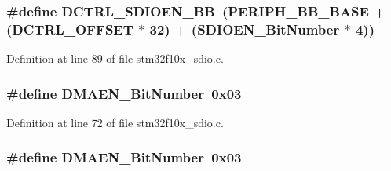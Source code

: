 \subsubsection[{\texorpdfstring{D\+C\+T\+R\+L\+\_\+\+S\+D\+I\+O\+E\+N\+\_\+\+BB}{DCTRL_SDIOEN_BB}}]{\setlength{\rightskip}{0pt plus 5cm}\#define D\+C\+T\+R\+L\+\_\+\+S\+D\+I\+O\+E\+N\+\_\+\+BB~({\bf P\+E\+R\+I\+P\+H\+\_\+\+B\+B\+\_\+\+B\+A\+SE} + ({\bf D\+C\+T\+R\+L\+\_\+\+O\+F\+F\+S\+ET} $\ast$ 32) + ({\bf S\+D\+I\+O\+E\+N\+\_\+\+Bit\+Number} $\ast$ 4))}\hypertarget{group___s_d_i_o___private___types_definitions_ga894f7da62b89ddd9f4b79d066056a3c7}{}\label{group___s_d_i_o___private___types_definitions_ga894f7da62b89ddd9f4b79d066056a3c7}


Definition at line 89 of file stm32f10x\+\_\+sdio.\+c.

\subsubsection[{\texorpdfstring{D\+M\+A\+E\+N\+\_\+\+Bit\+Number}{DMAEN_BitNumber}}]{\setlength{\rightskip}{0pt plus 5cm}\#define D\+M\+A\+E\+N\+\_\+\+Bit\+Number~0x03}\hypertarget{group___s_d_i_o___private___types_definitions_gab2af311e327213503f0dbf3d013b7944}{}\label{group___s_d_i_o___private___types_definitions_gab2af311e327213503f0dbf3d013b7944}


Definition at line 72 of file stm32f10x\+\_\+sdio.\+c.

\subsubsection[{\texorpdfstring{D\+M\+A\+E\+N\+\_\+\+Bit\+Number}{DMAEN_BitNumber}}]{\setlength{\rightskip}{0pt plus 5cm}\#define D\+M\+A\+E\+N\+\_\+\+Bit\+Number~0x03}\hypertarget{group___s_d_i_o___private___types_definitions_gab2af311e327213503f0dbf3d013b7944}{}\label{group___s_d_i_o___private___types_definitions_gab2af311e327213503f0dbf3d013b7944}


